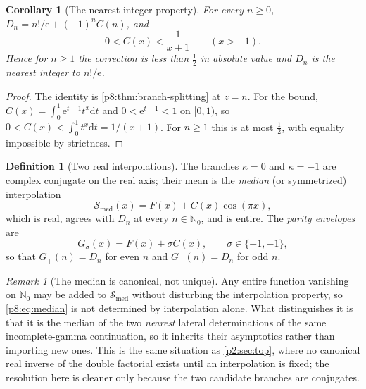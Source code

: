 \documentclass[11pt,a4paper,oneside]{book}
\theoremstyle{plain}
\newtheorem{corollary}[theorem]{Corollary}
\theoremstyle{definition}
\newtheorem{definition}[theorem]{Definition}
\theoremstyle{remark}
\newtheorem{remark}[theorem]{Remark}
\newcommand{\Nat}{\mathbb{N}}
\newcommand{\e}{\mathrm{e}}
\newcommand{\dd}{\mathrm{d}}
\begin{document}
\begin{corollary}[The nearest-integer property]\label{p8:cor:nearest-integer}
For every $n\ge0$, $D_n=n!/\e+(-1)^{n}C(n)$, and
\begin{equation}\label{p8:eq:C-bound}
 0<C(x)<\frac1{x+1}\qquad(x>-1).
\end{equation}
Hence for $n\ge1$ the correction is less than $\tfrac12$ in absolute value and
$D_n$ is the nearest integer to $n!/\e$.
\end{corollary}

\begin{proof}
The identity is \cref{p8:thm:branch-splitting} at $z=n$.  For the bound,
$C(x)=\int_0^{1}\e^{t-1}t^{x}\dd t$ and $0<\e^{t-1}<1$ on $[0,1)$, so
$0<C(x)<\int_0^{1}t^{x}\dd t=1/(x+1)$.  For $n\ge1$ this is at most
$\tfrac12$, with equality impossible by strictness.
\end{proof}

\begin{definition}[Two real interpolations]\label{p8:def:interpolations}
The branches $\kappa=0$ and $\kappa=-1$ are complex conjugate on the real
axis; their mean is the \emph{median} (or symmetrized) interpolation
\begin{equation}\label{p8:eq:median}
 \mathcal{S}_{\mathrm{med}}(x)=F(x)+C(x)\cos(\pi x),
\end{equation}
which is real, agrees with $D_n$ at every $n\in\Nat_0$, and is entire.  The
\emph{parity envelopes} are
\begin{equation}\label{p8:eq:envelopes}
 G_\sigma(x)=F(x)+\sigma C(x),\qquad\sigma\in\{+1,-1\},
\end{equation}
so that $G_{+}(n)=D_n$ for even $n$ and $G_{-}(n)=D_n$ for odd $n$.
\end{definition}

\begin{remark}[The median is canonical, not unique]\label{p8:rem:not-unique}
Any entire function vanishing on $\Nat_0$ may be added to
$\mathcal{S}_{\mathrm{med}}$ without disturbing the interpolation property, so
\eqref{p8:eq:median} is not determined by interpolation alone.  What
distinguishes it is that it is the median of the two \emph{nearest} lateral
determinations of the same incomplete-gamma continuation, so it inherits their
asymptotics rather than importing new ones.  This is the same situation as
\cref{p2:sec:top}, where no canonical real inverse of the double factorial
exists until an interpolation is fixed; the resolution here is cleaner only
because the two candidate branches are conjugates.
\end{remark}
\end{document}
